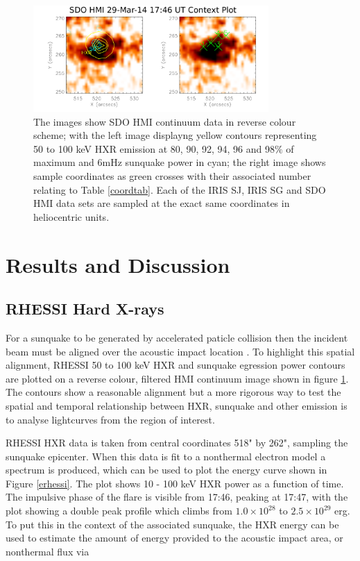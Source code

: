 \documentclass[11pt]{article}
\begin{document}
\begin{figure}[H]
  \begin{center}
  \includegraphics[width=0.8\textwidth]{29-Mar-14-HMI-Sunquake-Context-Plot}
  \end{center}
  \caption{The images show SDO HMI continuum data in reverse colour scheme; with the left image displayng yellow contours representing 50 to 100 keV HXR emission at 80, 90, 92, 94, 96 and 98$\%$ of maximum and 6mHz sunquake power in cyan; the right image shows sample coordinates as green crosses with their associated number relating to Table \ref{coordtab}. Each of the IRIS SJ, IRIS SG and SDO HMI data sets are sampled at the exact same coordinates in heliocentric units.}\label{hmicontext}
\end{figure}


\section{Results and Discussion}
\subsection{RHESSI Hard X-rays}
For a sunquake to be generated by accelerated paticle collision then the incident beam must be aligned over the acoustic impact location \citep{1998IAUS..185..191K}. To highlight this spatial alignment, RHESSI 50 to 100 keV HXR and sunquake egression power contours are plotted on a reverse colour, filtered HMI continuum image shown in figure \ref{hmicontext}. The contours show a reasonable alignment but a more rigorous way to test the spatial and temporal relationship between HXR, sunquake and other emission is to analyse lightcurves from the region of interest.   %

RHESSI HXR data is taken from central coordinates 518" by 262", sampling the sunquake epicenter. When this data is fit to a nonthermal electron model a spectrum is produced, which can be used to plot the energy curve shown in Figure \ref{erhessi}. The plot shows 10 - 100 keV HXR power as a function of time. The impulsive phase of the flare is visible from 17:46, peaking at 17:47, with the plot showing a double peak profile which climbs from $1.0{\times}10^{28}$ to $2.5{\times}10^{29}$ erg. To put this in the context of the associated sunquake, the HXR energy can be used to estimate the amount of energy provided to the acoustic impact area, or nonthermal flux via
\end{document}

